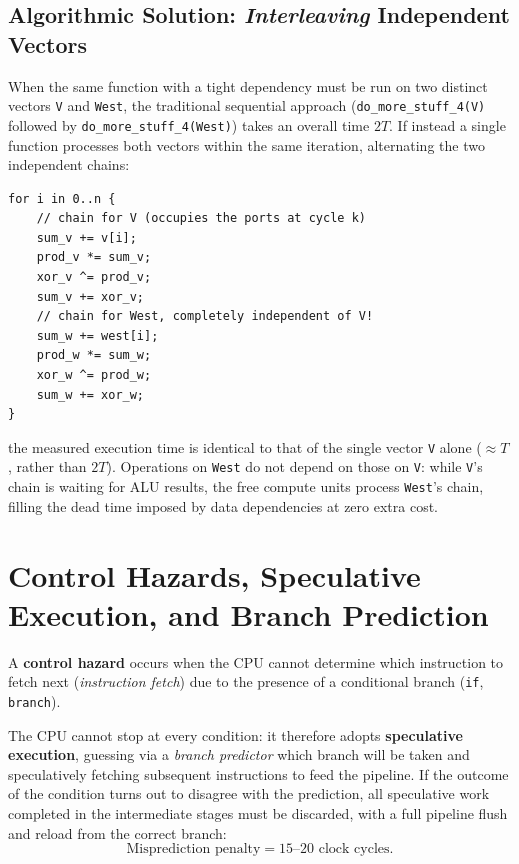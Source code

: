 \subsection{Algorithmic Solution: \textit{Interleaving} Independent Vectors}

When the same function with a tight dependency must be run on two distinct vectors \texttt{V} and \texttt{West}, the traditional sequential approach (\texttt{do\_more\_stuff\_4(V)} followed by \texttt{do\_more\_stuff\_4(West)}) takes an overall time $2T$. If instead a single function processes both vectors within the same iteration, alternating the two independent chains:

\begin{lstlisting}[style=rustcode,caption={Fusion (interleaving) of two mutually independent RAW chains.}]
for i in 0..n {
    // chain for V (occupies the ports at cycle k)
    sum_v += v[i];
    prod_v *= sum_v;
    xor_v ^= prod_v;
    sum_v += xor_v;
    // chain for West, completely independent of V!
    sum_w += west[i];
    prod_w *= sum_w;
    xor_w ^= prod_w;
    sum_w += xor_w;
}
\end{lstlisting}

the measured execution time is identical to that of the single vector \texttt{V} alone ($\approx T$, rather than $2T$). Operations on \texttt{West} do not depend on those on \texttt{V}: while \texttt{V}'s chain is waiting for ALU results, the free compute units process \texttt{West}'s chain, filling the dead time imposed by data dependencies at zero extra cost.

\FloatBarrier
\section{Control Hazards, Speculative Execution, and Branch Prediction}

\begin{definition}
A \textbf{control hazard} occurs when the CPU cannot determine which instruction to fetch next (\textit{instruction fetch}) due to the presence of a conditional branch (\texttt{if}, \texttt{branch}).
\end{definition}

The CPU cannot stop at every condition: it therefore adopts \textbf{speculative execution}, guessing via a \textit{branch predictor} which branch will be taken and speculatively fetching subsequent instructions to feed the pipeline. If the outcome of the condition turns out to disagree with the prediction, all speculative work completed in the intermediate stages must be discarded, with a full pipeline flush and reload from the correct branch:
\[
\text{Misprediction penalty} = 15\text{--}20 \text{ clock cycles}.
\]

